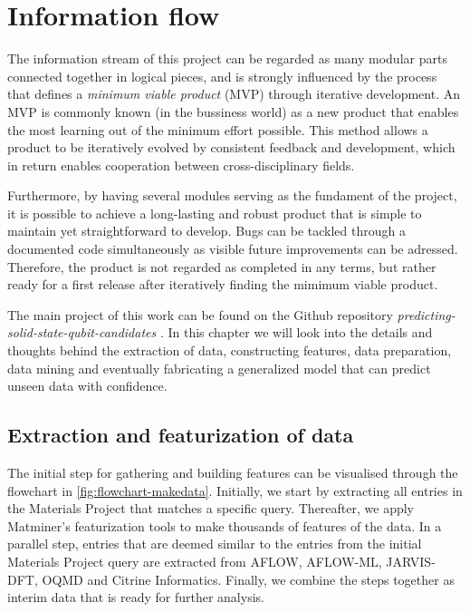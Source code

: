 \chapter{Information flow}

The information stream of this project can be regarded as many modular parts connected together in logical pieces, and is strongly influenced by the process that defines a \textit{minimum viable product} (MVP) through iterative development. An MVP is commonly known (in the bussiness world) as a new product that enables the most learning out of the minimum effort possible. This method allows a product to be iteratively evolved by consistent feedback and development, which in return enables cooperation between cross-disciplinary fields.

Furthermore, by having several modules serving as the fundament of the project, it is possible to achieve a long-lasting and robust product that is simple to maintain yet straightforward to develop. Bugs can be tackled through a documented code simultaneously as visible future improvements can be adressed. Therefore, the product is not regarded as completed in any terms, but rather ready for a first release after iteratively finding the mimimum viable product.

The main project of this work can be found on the Github repository \textit{predicting-solid-state-qubit-candidates} \cite{Ohebbi2021}. In this chapter we will look into the details and thoughts behind the extraction of data, constructing features, data preparation, data mining and eventually fabricating a generalized model that can predict unseen data with confidence.

\section{Extraction and featurization of data}

The initial step for gathering and building features can be visualised through the flowchart in \autoref{fig:flowchart-makedata}. Initially, we start by extracting all entries in the Materials Project that matches a specific query. Thereafter, we apply Matminer's featurization tools to make thousands of features of the data. In a parallel step, entries that are deemed similar to the entries from the initial Materials Project query are extracted from AFLOW, AFLOW-ML, JARVIS-DFT, OQMD and Citrine Informatics. Finally, we combine the steps together as interim data that is ready for further analysis.

